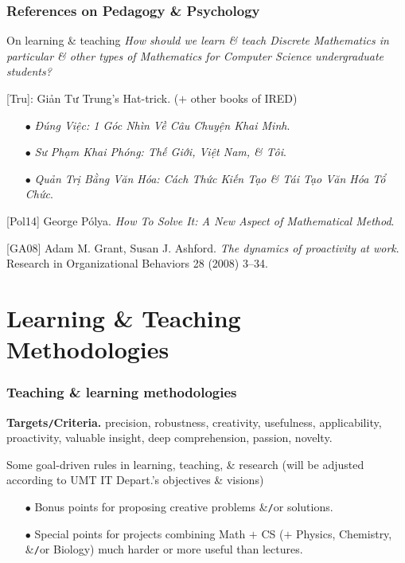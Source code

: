 \documentclass{beamer}
\begin{document}
\begin{frame}
	\frametitle{References on Pedagogy \& Psychology}
	\begin{block}{On learning \& teaching}\it
		How should we learn \& teach Discrete Mathematics in particular \& other types of Mathematics for Computer Science undergraduate students?
	\end{block}
	[Tru]: {\sc Giản Tư Trung}'s Hat-trick. ($+$ other books of IRED)
	\begin{itemize}
		\item[$\bullet$] {\it Đúng Việc: 1 Góc Nhìn Về Câu Chuyện Khai Minh}.
		\item[$\bullet$] {\it Sư Phạm Khai Phóng: Thế Giới, Việt Nam, \& Tôi}.
		\item[$\bullet$] {\it Quản Trị Bằng Văn Hóa: Cách Thức Kiến Tạo \& Tái Tạo Văn Hóa Tổ Chức}.
	\end{itemize}
	\vspace{2mm}
	
	[Pol14] {\sc George P\'olya}. {\it How To Solve It: A New Aspect of Mathematical Method}.
	\vspace{2mm}
	
	[GA08] {\sc Adam M. Grant, Susan J. Ashford}. {\it The dynamics of proactivity at work}. Research in Organizational Behaviors 28 (2008) 3--34.
\end{frame}

\section{Learning \& Teaching Methodologies}

\begin{frame}
	\frametitle{Teaching \& learning methodologies}
	{\bf Targets{\tt/}Criteria.} precision, robustness, creativity, usefulness, applicability, proactivity, valuable insight, deep comprehension, passion, novelty.
	\begin{block}{Some goal-driven rules in learning, teaching, \& research}
		(will be adjusted according to UMT IT Depart.'s objectives \& visions)
		\begin{itemize}
			\item[$\bullet$] Bonus points for proposing creative problems \&{\tt/}or solutions.
			\item[$\bullet$] Special points for projects combining Math $+$ CS ($+$ Physics, Chemistry, \&{\tt/}or Biology) much harder or more useful than lectures.
		\end{itemize}
	\end{block}
\end{frame}
\end{document}
